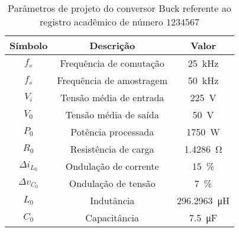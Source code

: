 \begin{table}[!ht]
\centering
\caption{Parâmetros de projeto do conversor Buck referente ao registro acadêmico de número $1234567$}
\label{tab:parametros}
\begin{tabular}{@{}ccc@{}}
\toprule
\textbf{Símbolo} & \textbf{Descrição} & \textbf{Valor}\\ \midrule
$f_s$ & Frequência de comutação & \SI{25}{\kilo\hertz}\\
$f_s$ & Frequência de amostragem & \SI{50}{\kilo\hertz}\\
$V_i$ & Tensão média de entrada  & \SI{225}{\V}\\
$V_0$ & Tensão média de saída  & \SI{50}{\V} \\
$P_0$ & Potência processada  & \SI{1750}{\W} \\
$R_0$ & Resistência de carga & \SI{1.4286}{\ohm} \\
$\Delta{i_{L_0}}$  & Ondulação de corrente & \SI{15}{\%}\\
$\Delta{v_{C_0}}$  & Ondulação de tensão & \SI{7}{\%}\\
$L_0$ & Indutância & \SI{296.2963}{\micro\henry}\\
$C_0$ & Capacitância & \SI{7.5}{\micro\farad}\\
\bottomrule
\end{tabular}
\end{table}

